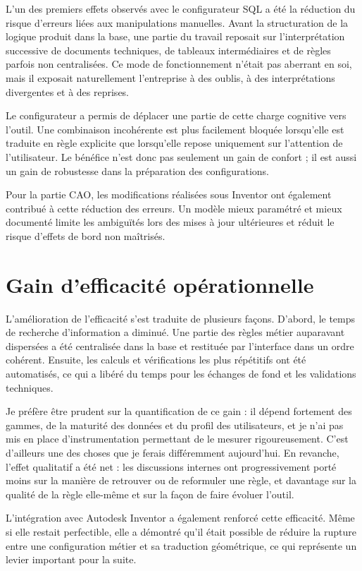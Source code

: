 L'un des premiers effets observés avec le configurateur SQL a été la réduction du risque d'erreurs liées aux manipulations manuelles. Avant la structuration de la logique produit dans la base, une partie du travail reposait sur l'interprétation successive de documents techniques, de tableaux intermédiaires et de règles parfois non centralisées. Ce mode de fonctionnement n'était pas aberrant en soi, mais il exposait naturellement l'entreprise à des oublis, à des interprétations divergentes et à des reprises.

Le configurateur a permis de déplacer une partie de cette charge cognitive vers l'outil. Une combinaison incohérente est plus facilement bloquée lorsqu'elle est traduite en règle explicite que lorsqu'elle repose uniquement sur l'attention de l'utilisateur. Le bénéfice n'est donc pas seulement un gain de confort ; il est aussi un gain de robustesse dans la préparation des configurations.

Pour la partie CAO, les modifications réalisées sous Inventor ont également contribué à cette réduction des erreurs. Un modèle mieux paramétré et mieux documenté limite les ambiguïtés lors des mises à jour ultérieures et réduit le risque d'effets de bord non maîtrisés.

\section{Gain d'efficacité opérationnelle}

L'amélioration de l'efficacité s'est traduite de plusieurs façons. D'abord, le temps de recherche d'information a diminué. Une partie des règles métier auparavant dispersées a été centralisée dans la base et restituée par l'interface dans un ordre cohérent. Ensuite, les calculs et vérifications les plus répétitifs ont été automatisés, ce qui a libéré du temps pour les échanges de fond et les validations techniques.

Je préfère être prudent sur la quantification de ce gain : il dépend fortement des gammes, de la maturité des données et du profil des utilisateurs, et je n'ai pas mis en place d'instrumentation permettant de le mesurer rigoureusement. C'est d'ailleurs une des choses que je ferais différemment aujourd'hui. En revanche, l'effet qualitatif a été net : les discussions internes ont progressivement porté moins sur la manière de retrouver ou de reformuler une règle, et davantage sur la qualité de la règle elle-même et sur la façon de faire évoluer l'outil.

L'intégration avec Autodesk Inventor a également renforcé cette efficacité. Même si elle restait perfectible, elle a démontré qu'il était possible de réduire la rupture entre une configuration métier et sa traduction géométrique, ce qui représente un levier important pour la suite.

